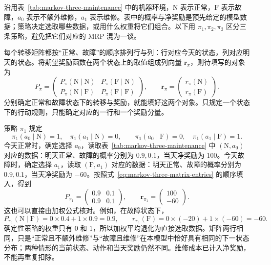 \documentclass[UTF8]{ctexart}
\begin{document}
沿用表~\ref{tab:markov-three-maintenance} 中的机器环境，$\mathrm N$ 表示正常，$\mathrm F$ 表示故障，$a_0$ 表示不额外维修，$a_1$ 表示维修。表中的概率与净奖励是预先给定的模型数据；策略决定选取哪些数据，或用什么权重将它们组合。以下用 $\pi_1,\pi_2,\pi_3$ 区分三条策略，避免把它们对应的 MRP 混为一谈。

每个转移矩阵都按“正常、故障”的顺序排列行与列：行对应今天的状态，列对应明天的状态。将期望奖励函数在两个状态上的取值组成列向量 $\boldsymbol r_\pi$，则待填写的对象为
\begin{equation}
  P_\pi=
  \begin{pmatrix}
    P_\pi(\mathrm N\mid\mathrm N)&P_\pi(\mathrm F\mid\mathrm N)\\
    P_\pi(\mathrm N\mid\mathrm F)&P_\pi(\mathrm F\mid\mathrm F)
  \end{pmatrix},
  \qquad
  \boldsymbol r_\pi=
  \begin{pmatrix}r_\pi(\mathrm N)\\r_\pi(\mathrm F)\end{pmatrix}.
  \label{eq:markov-three-matrix-entries}
\end{equation}
分别确定正常和故障状态下的转移与奖励，就能填好这两个对象。只规定一个状态下的行动规则，只能确定对应的一行和一个奖励分量。

\begin{example}
\label{ex:markov-three-policy-repair}
策略 $\pi_1$ 规定
\[
  \pi_1(a_0\mid\mathrm N)=1,\quad
  \pi_1(a_1\mid\mathrm N)=0,\qquad
  \pi_1(a_0\mid\mathrm F)=0,\quad
  \pi_1(a_1\mid\mathrm F)=1.
\]
今天正常时，确定选择 $a_0$，读取表~\ref{tab:markov-three-maintenance} 中 $(\mathrm N,a_0)$ 对应的数据：明天正常、故障的概率分别为 $0.9,0.1$，当天净奖励为 $100$。今天故障时，确定选择 $a_1$，读取 $(\mathrm F,a_1)$ 对应的数据：明天正常、故障的概率分别为 $0.9,0.1$，当天净奖励为 $-60$。按照式~\eqref{eq:markov-three-matrix-entries} 的顺序填入，得到
\begin{equation}
  P_{\pi_1}=\begin{pmatrix}0.9&0.1\\0.9&0.1\end{pmatrix},
  \qquad
  \boldsymbol r_{\pi_1}=\begin{pmatrix}100\\-60\end{pmatrix}.
  \label{eq:markov-three-policy-repair-mrp}
\end{equation}
这也可以直接由加权公式核对。例如，在故障状态下，
\[
  P_{\pi_1}(\mathrm N\mid\mathrm F)=0\times0.4+1\times0.9=0.9,
  \qquad
  r_{\pi_1}(\mathrm F)=0\times(-20)+1\times(-60)=-60.
\]
确定性策略的权重只有 $0$ 和 $1$，所以加权平均退化为直接选取数据。矩阵两行相同，只是“正常且不额外维修”与“故障且维修”在本模型中恰好具有相同的下一状态分布；两种情形的当前状态、动作和当天奖励仍然不同。维修成本已计入净奖励，不能再重复扣除。
\end{example}
\end{document}
